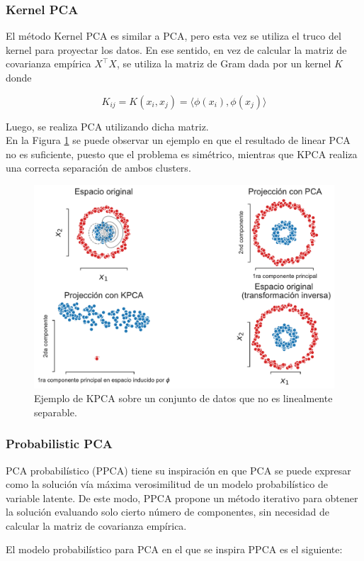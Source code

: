\subsubsection{Kernel PCA}
El método Kernel PCA es similar a PCA, pero esta vez se utiliza el truco del kernel para proyectar los datos. En ese sentido, en vez de calcular la matriz de covarianza empírica $X^\top X$, se utiliza la matriz de Gram dada por un kernel $K$ donde

$$
K_{ij} = K(x_i,x_j) = \langle\phi(x_i),\phi(x_j)\rangle
$$

Luego, se realiza PCA utilizando dicha matriz.\\

En la Figura \ref{fig:kpca} se puede observar un ejemplo en que el resultado de linear PCA no es suficiente, puesto que el problema es simétrico, mientras que KPCA realiza una correcta separación de ambos clusters.

\begin{figure}[ht]
    \centering
    \includegraphics[width=0.7\linewidth]{img/cap6_kpca.pdf}
    \caption{Ejemplo de KPCA sobre un conjunto de datos que no es linealmente separable.}
    \label{fig:kpca}
\end{figure}

\subsubsection{Probabilistic PCA}
PCA probabilístico (PPCA) tiene su inspiración en que PCA se puede expresar como la solución vía máxima verosimilitud de un modelo probabilístico de variable latente. De este modo, PPCA propone un método iterativo para obtener la solución evaluando solo cierto número de componentes, sin necesidad de calcular la matriz de covarianza empírica.

El modelo probabilístico para PCA en el que se inspira PPCA es el siguiente:\\


